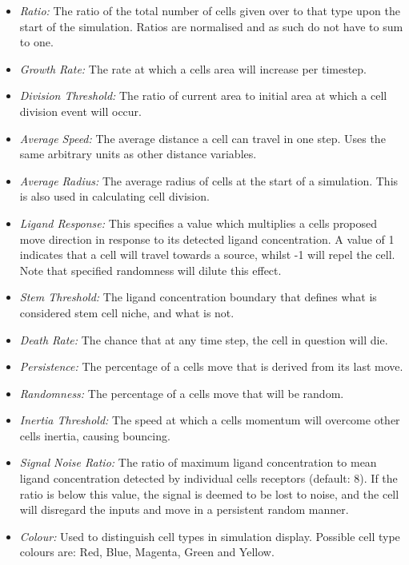 \documentclass[11.5pt]{article}
\begin{document}
\begin{itemize}
\item {\itshape Ratio: }The ratio of the total number of cells given 
over to that type upon the start of the simulation. Ratios are 
normalised and as such do not have to sum to one.
\item {\itshape Growth Rate: }The rate at which a cells area will 
increase per timestep.
\item {\itshape Division Threshold: }The ratio of current area to 
initial area at which a cell division event will occur.
\item {\itshape Average Speed: }The average distance a cell can travel 
in one step. Uses the same arbitrary units as other distance variables.
\item {\itshape Average Radius: }The average radius of cells at the 
start of a simulation. This is also used in calculating cell division.
\item {\itshape Ligand Response: }This specifies a value which 
multiplies a cells proposed move direction in response to its detected 
ligand concentration. A value of 1 indicates that a cell will travel 
towards a source, whilst -1 will repel the cell. Note that specified 
randomness will dilute this effect.
\item {\itshape Stem Threshold: }The ligand concentration boundary that 
defines what is considered stem cell niche, and what is not.
\item {\itshape Death Rate: }The chance that at any time step, the cell 
in question will die.
\item {\itshape Persistence: }The percentage of a cells move that is 
derived from its last move.
\item {\itshape Randomness: }The percentage of a cells move that will be 
random.
\item {\itshape Inertia Threshold: }The speed at which a cells momentum 
will overcome other cells inertia, causing bouncing.
\item {\itshape Signal Noise Ratio: }The ratio of maximum ligand 
concentration to mean ligand concentration detected by individual cells 
receptors (default: 8). If the ratio is below this value, the signal is 
deemed to be lost to noise, and the cell will disregard the inputs and 
move in a persistent random manner.
\item {\itshape Colour:} Used to distinguish cell types in simulation 
display. Possible cell type colours are: Red, Blue, Magenta, Green and 
Yellow.

\end{itemize}
\end{document}
